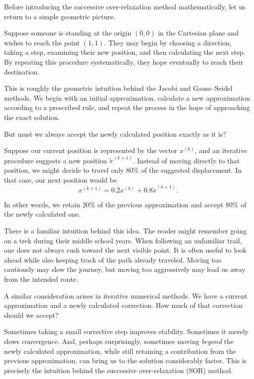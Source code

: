 \documentclass[11pt,a4paper]{article}
\theoremstyle{definition}
\theoremstyle{remark}
\begin{document}
Before introducing the successive over-relaxation
method mathematically, let us return to a simple
geometric picture.

Suppose someone is standing at the origin
$(0,0)$ in the Cartesian plane and wishes to
reach the point $(1,1)$. They may begin by
choosing a direction, taking a step, examining
their new position, and then calculating the
next step. By repeating this procedure
systematically, they hope eventually to reach
their destination.

This is roughly the geometric intuition behind
the Jacobi and Gauss--Seidel methods. We begin
with an initial approximation, calculate a
new approximation according to a prescribed
rule, and repeat the process in the hope of
approaching the exact solution.

But must we always accept the newly calculated
position exactly as it is?

Suppose our current position is represented
by the vector $x^{(k)}$, and an iterative
procedure suggests a new position
$\widetilde{x}^{(k+1)}$. Instead of moving
directly to that position, we might decide
to travel only $80\%$ of the suggested
displacement. In that case, our next position
would be
\[
    x^{(k+1)}
    =
    0.2x^{(k)}
    +
    0.8\widetilde{x}^{(k+1)}.
\]

In other words, we retain $20\%$ of the
previous approximation and accept $80\%$
of the newly calculated one.

There is a familiar intuition behind this
idea. The reader might remember going on
a trek during their middle school years. When
following an unfamiliar trail, one does
not always rush toward the next visible
point. It is often useful to look ahead
while also keeping track of the path
already traveled. Moving too cautiously
may slow the journey, but moving too
aggressively may lead us away from the
intended route.

A similar consideration arises in
iterative numerical methods. We have
a current approximation and a newly
calculated correction. How much of that
correction should we accept?

Sometimes taking a small corrective step improves
stability. Sometimes it merely slows
convergence.
And, perhaps surprisingly, sometimes moving
\emph{beyond} the newly calculated approximation,
while still retaining a contribution from the
previous approximation, can bring us to the
solution considerably faster. This is precisely
the intuition behind the successive
over-relaxation (SOR) method.
\end{document}
